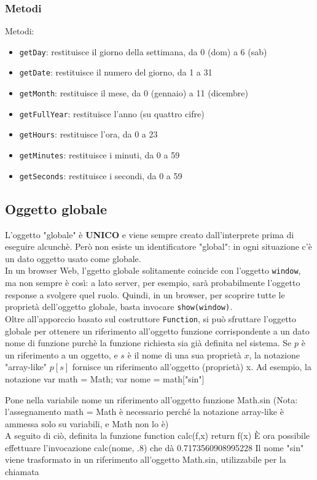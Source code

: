 \documentclass{article}
\begin{document}
\subsubsection{Metodi}
Metodi:
\begin{itemize}
    \item \texttt{getDay}: restituisce il giorno della settimana, da 0 (dom) a 6 (sab)
    \item \texttt{getDate}: restituisce il numero del giorno, da 1 a 31
    \item \texttt{getMonth}: restituisce il mese, da 0 (gennaio) a 11 (dicembre)
    \item \texttt{getFullYear}: restituisce l'anno (su quattro cifre)
    \item \texttt{getHours}: restituisce l'ora, da 0 a 23
    \item \texttt{getMinutes}: restituisce i minuti, da 0 a 59
    \item \texttt{getSeconds}: restituisce i secondi, da 0 a 59
\end{itemize}
\subsection{Oggetto globale}
L'oggetto "globale" è \textbf{UNICO} e viene sempre creato dall'interprete prima di eseguire alcunchè. Però non esiste un identificatore "global": in ogni situazione c'è un dato oggetto usato come globale.
\\ In un browser Web, l'ggetto globale solitamente coincide con l'oggetto \texttt{window}, ma non sempre è così: a lato server, per esempio, sarà probabilmente l'oggetto response a svolgere quel ruolo. Quindi, in un browser, per scoprire tutte le proprietà dell'oggetto globale, basta invocare
\texttt{show(window)}.
\\ Oltre all'apporccio basato sul costruttore \texttt{Function}, si può sfruttare l'oggetto globale per ottenere un riferimento all'oggetto funzione corrispondente a un dato nome di funzione purchè la funzione richiesta sia già definita nel sistema. Se  $p$ è un riferimento a un oggetto, e $s$ è il nome di una sua
proprietà $x$, la notazione "array-like" $p[s]$ fornisce un riferimento all'oggetto (proprietà) x. Ad esempio, la notazione
var math = Math; var nome = math["sin"]

Pone nella variabile nome un riferimento all'oggetto funzione
Math.sin (Nota: l'assegnamento math = Math è necessario
perché la notazione array-like è ammessa solo su variabili, e
Math non lo è)
\\ A seguito di ciò, definita la funzione
function calc(f,x) { return f(x) }
È ora possibile effettuare l'invocazione
calc(nome, .8)
che dà 0.7173560908995228
Il nome "sin" viene trasformato in un riferimento all'oggetto
Math.sin, utilizzabile per la chiamata
\end{document}
